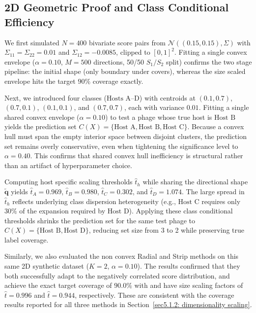 

\subsection{2D Geometric Proof and Class Conditional Efficiency}
\label{sec5.1.1: 2d proof of concept}

We first simulated $N = 400$ bivariate score pairs from $\mathcal{N}((0.15,0.15), \Sigma)$ with 
$\Sigma_{11}=\Sigma_{22}=0.01$ and $\Sigma_{12}=-0.0085$, clipped to $[0,1]^2$. Fitting a single convex envelope 
($\alpha=0.10$, $M=500$ directions, 50/50 $S_1/S_2$ split) confirms the two stage pipeline: the initial shape (only boundary 
under covers), whereas the size scaled envelope hits the target $90\%$ coverage exactly.

Next, we introduced four classes ($\text{Hosts A--D}$) with centroids at $(0.1,0.7)$, $(0.7,0.1)$, $(0.1,0.1)$, 
and $(0.7,0.7)$, each with variance $0.01$. Fitting a single shared convex envelope ($\alpha=0.10$) to test a phage whose 
true host is $\text{Host B}$ yields the prediction set $C(X) = \{\text{Host A}, \text{Host B}, \text{Host C}\}$. Because a 
convex hull must span the empty interior space between disjoint clusters, the prediction set remains overly conservative, even 
when tightening the significance level to $\alpha=0.40$. This confirms that shared convex hull inefficiency is structural 
rather than an artifact of hyperparameter choice.

Computing host specific scaling thresholds $\hat{t}_h$ while sharing the directional shape $\tilde{\mathbf{q}}$ 
yields $\hat{t}_A = 0.969$, $\hat{t}_B = 0.980$, $\hat{t}_C = 0.302$, and $\hat{t}_D = 1.074$. The large spread in $\hat{t}_h$ 
reflects underlying class dispersion heterogeneity (e.g., $\text{Host C}$ requires only $30\%$ of the expansion required by 
$\text{Host D}$). Applying these class conditional thresholds shrinks the prediction set for the same test phage to $C(X) = 
\{\text{Host B}, \text{Host D}\}$, reducing set size from 3 to 2 while preserving true label coverage.


Similarly, we also evaluated the non convex Radial and Strip methods on this same 2D synthetic dataset ($K=2$, $\alpha=0.10$). The 
results confirmed that they both successfully adapt to the negatively correlated score distribution, and achieve the exact target 
coverage of $90.0\%$ with and have size scaling factors of $\hat{t} = 0.996$ and $\hat{t} = 0.944$, respectively. These are consistent 
with the coverage results reported for all three methods in Section~\ref{sec5.1.2: dimensionality scaling}.

